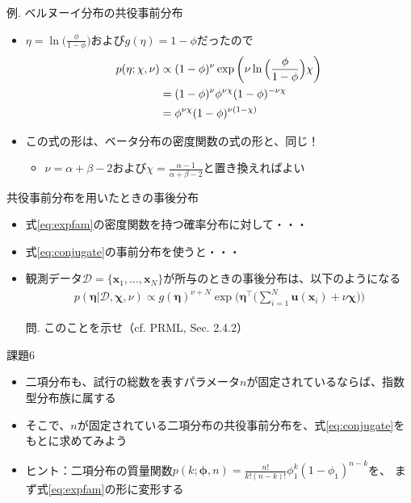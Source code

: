 \documentclass[aspectratio=169,unicode,dvipdfmx,14pt]{beamer}
\begin{document}
\begin{frame}{例. ベルヌーイ分布の共役事前分布}
\begin{itemize}
\item $\eta = \ln \Big( \frac{\phi}{1 - \phi} \Big)$および$g(\eta) = 1 - \phi$だったので
\begin{align}
p(\eta; \chi,\nu) & \propto (1 - \phi)^\nu \exp \bigg(\nu \ln \Big( \frac{\phi}{1 - \phi} \Big) \chi \bigg)
\notag \\ & = (1 - \phi)^\nu \phi^{\nu\chi} (1 - \phi)^{ - \nu\chi}
\notag \\ & = \phi^{\nu\chi} (1 - \phi)^{\nu(1 - \chi)}
\end{align}
\item この式の形は、ベータ分布の密度関数の式の形と、同じ！
\begin{itemize}
\item $\nu = \alpha + \beta - 2$および$\chi = \frac{\alpha - 1}{\alpha + \beta - 2}$と置き換えればよい
\end{itemize}
\end{itemize}
\end{frame}

\begin{frame}{共役事前分布を用いたときの事後分布}
\begin{itemize}
\item 式\eqref{eq:expfam}の密度関数を持つ確率分布に対して・・・
\item 式\eqref{eq:conjugate}の事前分布を使うと・・・
\item 観測データ$\mathcal{D} = \{ \bm{x}_1, \ldots, \bm{x}_N \}$が所与のときの事後分布は、以下のようになる
\begin{align}
p(\bm{\eta}|\mathcal{D},\bm{\chi},\nu) \propto g(\bm{\eta})^{\nu + N}
\exp\bigg( \bm{\eta}^\intercal \bigg( \sum_{i=1}^N \bm{u}(\bm{x}_i) + \nu\bm{\chi} \bigg) \bigg)
\end{align}
\item[問.] このことを示せ（cf. PRML, Sec. 2.4.2）
\end{itemize}
\end{frame}


\begin{frame}{課題6}
\begin{itemize}
\item 二項分布も、試行の総数を表すパラメータ$n$が固定されているならば、指数型分布族に属する
\item そこで、$n$が固定されている二項分布の共役事前分布を、式\eqref{eq:conjugate}をもとに求めてみよう
\item ヒント：二項分布の質量関数$p(k;\bm{\phi},n)=\frac{n!}{k!(n-k)!}\phi_1^k(1-\phi_1)^{n-k}$を、
まず式\eqref{eq:expfam}の形に変形する
\end{itemize}
\end{frame}
\end{document}

